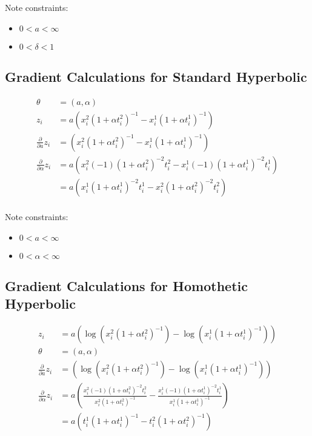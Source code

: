 \documentclass[12pt]{article}
\begin{document}
Note constraints:

\begin{itemize}
    \item{$0 < a < \infty$}
    \item{$0 < \delta < 1$}
\end{itemize}

\subsection{Gradient Calculations for Standard Hyperbolic}

\begin{align*}
\theta &= (a, \alpha) \\
z_i &= a (x^2_i (1 + \alpha t^2_i)^{-1} - x^1_i (1 + \alpha t^1_i)^{-1}) \\
\frac{\partial}{\partial a} z_i
  &= (x^2_i (1 + \alpha t^2_i)^{-1} - x^1_i (1 + \alpha t^1_i)^{-1}) \\
\frac{\partial}{\partial \alpha} z_i
  &= a (
    x^2_i (-1) (1 + \alpha t^2_i)^{-2} t^2_i
    - x^1_i (-1) (1 + \alpha t^1_i)^{-2} t^1_i
  ) \\
  &= a (
    x^1_i (1 + \alpha t^1_i)^{-2} t^1_i
    - x^2_i (1 + \alpha t^2_i)^{-2} t^2_i
  ) \\
\end{align*}

Note constraints:

\begin{itemize}
    \item{$0 < a < \infty$}
    \item{$0 < \alpha < \infty$}
\end{itemize}

\subsection{Gradient Calculations for Homothetic Hyperbolic}

\begin{align*}
  z_i &= a (
    \log(x^2_i (1 + \alpha t^2_i)^{-1})
    - \log(x^1_i (1 + \alpha t^1_i)^{-1})
  ) \\
  \theta &= (a, \alpha) \\
  \frac{\partial}{\partial a} z_i
    &= (\log(x^2_i (1 + \alpha t^2_i)^{-1}) - \log(x^1_i (1 + \alpha t^1_i)^{-1})) \\
  \frac{\partial}{\partial \alpha} z_i
    &= a (\frac{x^2_i (-1) (1 + \alpha t^2_i)^{-2} t^2_i}{x^2_i (1 + \alpha t^2_i)^{-1}}
      - \frac{x^1_i (-1) (1 + \alpha t^1_i)^{-2} t^1_i}{x^1_i (1 + \alpha t^1_i)^{-1}}) \\
    &= a (t^1_i (1 + \alpha t^1_i)^{-1} - t^2_i (1 + \alpha t^2_i)^{-1}) \\
\end{align*}
\end{document}
